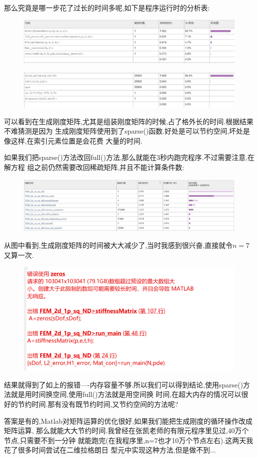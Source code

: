 \documentclass[11pt,reqno]{article}
\numberwithin{equation}{section}
\begin{document}
那么究竟是哪一步花了过长的时间多呢,如下是程序运行时的分析表:
\begin{figure}[h]
	\centering
	  \includegraphics[width=\textwidth]{time1.png}
\end{figure}
\begin{figure}[h]
	\centering
	  \includegraphics[width=\textwidth]{time2.png}
\end{figure}

可以看到在生成刚度矩阵,尤其是组装刚度矩阵的时候,占了格外长的时间.根据结果不难猜测是因为
生成刚度矩阵使用到了sparse()函数.好处是可以节约空间,坏处是像这样,在索引元素位置是会花费
大量的时间.

如果我们把sparse()方法改回full()方法,那么就能在3秒内跑完程序.不过需要注意,在解方程
组之前仍然需要改回稀疏矩阵,并且不能计算条件数:
\begin{figure}[h]
	\centering
	  \includegraphics[width=\textwidth]{time3.png}
\end{figure}
从图中看到,生成刚度矩阵的时间被大大减少了,当时我感到很兴奋,直接就令$n=7$又算一次.

\newpage
\begin{figure}[h]
	\centering
	  \includegraphics[width=\textwidth]{error.png}
\end{figure}
结果就得到了如上的报错----内存容量不够.所以我们可以得到结论,使用sparse()方法就是用时间换空间,使用full()方法就是用空间换
时间,在超大内存的情况可以很好的节约时间.那有没有既节约时间,又节约空间的方法呢?

答案是有的,Matlab对矩阵运算的优化很好,如果我们能把生成刚度的循环操作改成矩阵运算,
那么就能大大节约时间.我曾经在张凯老师的有限元程序里见过,40万个节点,只需要不到一分钟
就能跑完(在我程序里,n=7也才10万个节点左右).这两天我花了很多时间尝试在二维拉格朗日
型元中实现这种方法,但是做不到...
\end{document}
